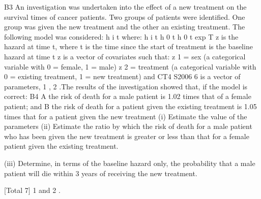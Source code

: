 \documentclass[a4paper,12pt]{article}
\begin{document}
B3
An investigation was undertaken into the effect of a new treatment on the survival
times of cancer patients. Two groups of patients were identified. One group was
given the new treatment and the other an existing treatment.
The following model was considered:
h i t
where: h i t
h 0 t
h 0 t exp
T
z
is the hazard at time t, where t is the time since the start of treatment
is the baseline hazard at time t
z
is a vector of covariates such that:
z 1 = sex (a categorical variable with 0 = female, 1 = male)
z 2 = treatment (a categorical variable with 0 = existing treatment,
1 = new treatment)
and
CT4 S2006
6
is a vector of parameters,
1 , 2
.The results of the investigation showed that, if the model is correct:
B4
A the risk of death for a male patient is 1.02 times that of a female
patient; and
B the risk of death for a patient given the existing treatment is 1.05 times
that for a patient given the new treatment
(i) Estimate the value of the parameters
(ii) Estimate the ratio by which the risk of death for a male patient who has been
given the new treatment is greater or less than that for a female patient given
the existing treatment.

(iii) Determine, in terms of the baseline hazard only, the probability that a male
patient will die within 3 years of receiving the new treatment.

[Total 7]
1
and
2 .
\end{document}
